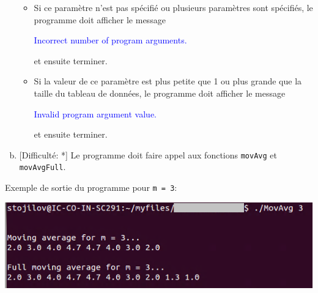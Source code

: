 \documentclass[11pt]{article}
\begin{document}
\begin{enumerate}[a)]
\begin{itemize}
	\item Si ce paramètre n'est pas spécifié ou plusieurs paramètres sont spécifiés, le programme doit afficher le message
	\begin{center}
	\textcolor{blue}{Incorrect number of program arguments.}
	\end{center}
	et ensuite terminer.

	\item Si la valeur de ce  paramètre est plus petite que 1 ou plus grande que la taille du tableau de données, le programme doit afficher le message
	\begin{center}
	\textcolor{blue}{Invalid program argument value.}
	\end{center}
	et ensuite terminer.

	\end{itemize}

\item \textcolor{mygreen}{[Difficulté: *]}  Le programme doit faire appel aux fonctions \texttt{movAvg} et \texttt{movAvgFull}.
\end{enumerate}

\vspace{20pt}

Exemple de sortie du programme pour \texttt{m = 3}:
\begin{center}
\includegraphics[scale=0.75]{Figures/Result.png}
\end{center}
\end{document}
